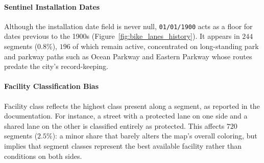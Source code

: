 \paragraph{Sentinel Installation Dates}
Although the installation date field is never null, \texttt{01/01/1900} acts as a floor for dates previous to the 1900s (Figure~\ref{fig:bike_lanes_history}).
It appears in $244$ segments ($0.8\%$), $196$ of which remain active, concentrated on long-standing park and parkway paths such as Ocean Parkway and Eastern Parkway whose routes predate the city's record-keeping.

\paragraph{Facility Classification Bias}
Facility class reflects the highest class present along a segment, as reported in the documentation.
For instance, a street with a protected lane on one side and a shared lane on the other is classified entirely as protected.
This affects $720$ segments ($2.5\%$): a minor share that barely alters the map's overall coloring, but implies that segment classes represent the best available facility rather than conditions on both sides.
